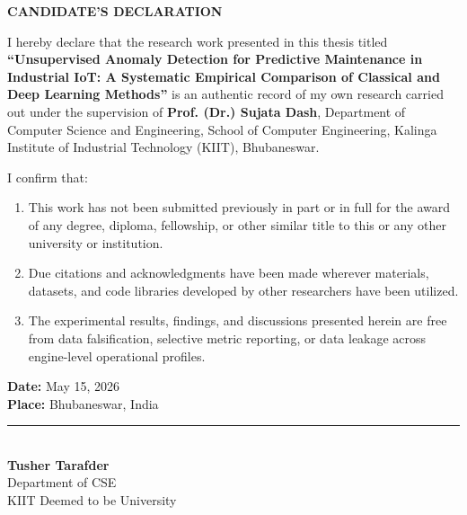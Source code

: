 \documentclass[12pt,a4paper,oneside]{report}
\begin{document}
\newpage
\thispagestyle{plain}
\begin{center}
    {\LARGE \textbf{CANDIDATE'S DECLARATION}}\\[1.5cm]
\end{center}

I hereby declare that the research work presented in this thesis titled \textbf{``Unsupervised Anomaly Detection for Predictive Maintenance in Industrial IoT: A Systematic Empirical Comparison of Classical and Deep Learning Methods''} is an authentic record of my own research carried out under the supervision of \textbf{Prof. (Dr.) Sujata Dash}, Department of Computer Science and Engineering, School of Computer Engineering, Kalinga Institute of Industrial Technology (KIIT), Bhubaneswar.

I confirm that:
\begin{enumerate}
    \item This work has not been submitted previously in part or in full for the award of any degree, diploma, fellowship, or other similar title to this or any other university or institution.
    \item Due citations and acknowledgments have been made wherever materials, datasets, and code libraries developed by other researchers have been utilized.
    \item The experimental results, findings, and discussions presented herein are free from data falsification, selective metric reporting, or data leakage across engine-level operational profiles.
\end{enumerate}

\vspace{3.5cm}

\noindent
\begin{minipage}{0.5\textwidth}
    \textbf{Date:} May 15, 2026\\
    \textbf{Place:} Bhubaneswar, India
\end{minipage}
\hfill
\begin{minipage}{0.45\textwidth}
    \flushright
    \rule{6cm}{0.4pt}\\
    \textbf{Tusher Tarafder}\\
    Department of CSE\\
    KIIT Deemed to be University
\end{minipage}
\end{document}

